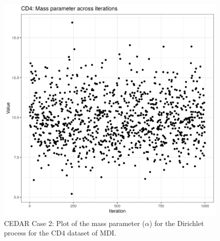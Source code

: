 \documentclass[12pt]{article} %
\begin{document}
	
	\begin{figure}[h]
		\centering
		\includegraphics[scale=0.75]{Images/Biology_data/Set_1000/All_datasets/Mass_parameter_plots/CD4.png}
		\caption{CEDAR Case 2: Plot of the mass parameter ($\alpha$) for the Dirichlet process for the CD4 dataset of MDI.}
		\label{fig:results:cedar_2:mdi_cd4_mass_parameter_plot}
	\end{figure}
	
	
	
	
\end{document}
